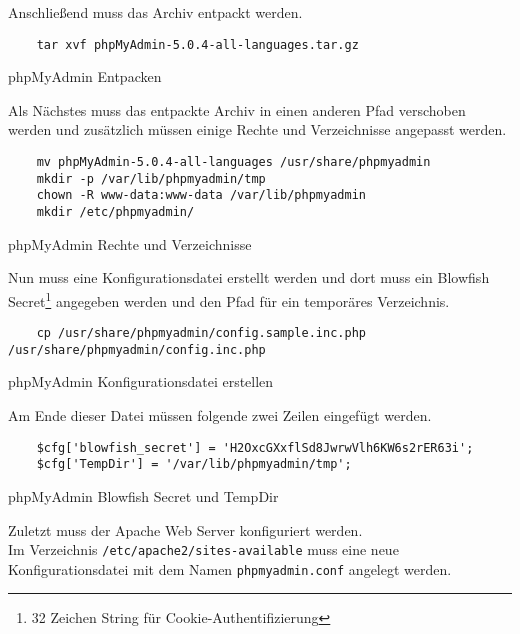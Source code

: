 Anschließend muss das Archiv entpackt werden.

\begin{listing}[H]
  \begin{verbatim}
    tar xvf phpMyAdmin-5.0.4-all-languages.tar.gz
  \end{verbatim}
  \caption{phpMyAdmin Entpacken}
\end{listing}

Als Nächstes muss das entpackte Archiv in einen anderen Pfad verschoben werden
und zusätzlich müssen einige Rechte und Verzeichnisse angepasst werden.

\begin{listing}[H]
  \begin{verbatim}
    mv phpMyAdmin-5.0.4-all-languages /usr/share/phpmyadmin
    mkdir -p /var/lib/phpmyadmin/tmp
    chown -R www-data:www-data /var/lib/phpmyadmin
    mkdir /etc/phpmyadmin/
  \end{verbatim}
  \caption{phpMyAdmin Rechte und Verzeichnisse}
\end{listing}

Nun muss eine Konfigurationsdatei erstellt werden und dort muss ein Blowfish
Secret\footnote{32 Zeichen String für Cookie-Authentifizierung} angegeben werden
und den Pfad für ein temporäres Verzeichnis.

\begin{listing}[H]
  \begin{verbatim}
    cp /usr/share/phpmyadmin/config.sample.inc.php /usr/share/phpmyadmin/config.inc.php
  \end{verbatim}
  \caption{phpMyAdmin Konfigurationsdatei erstellen}
\end{listing}

Am Ende dieser Datei müssen folgende zwei Zeilen eingefügt werden.

\begin{listing}[H]
  \begin{verbatim}
    $cfg['blowfish_secret'] = 'H2OxcGXxflSd8JwrwVlh6KW6s2rER63i'; 
    $cfg['TempDir'] = '/var/lib/phpmyadmin/tmp';
  \end{verbatim}
  \caption{phpMyAdmin Blowfish Secret und TempDir}
\end{listing}

Zuletzt muss der Apache Web Server konfiguriert werden.\\

Im Verzeichnis \verb|/etc/apache2/sites-available| muss eine neue
Konfigurationsdatei mit dem Namen \verb|phpmyadmin.conf| angelegt werden.

